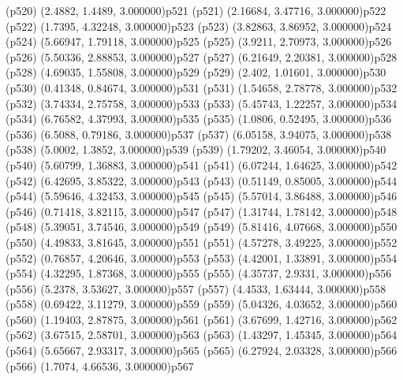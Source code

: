 \psdot(p520)
\psPoint(2.4882, 1.4489, 3.000000){p521}
\psdot(p521)
\psPoint(2.16684, 3.47716, 3.000000){p522}
\psdot(p522)
\psPoint(1.7395, 4.32248, 3.000000){p523}
\psdot(p523)
\psPoint(3.82863, 3.86952, 3.000000){p524}
\psdot(p524)
\psPoint(5.66947, 1.79118, 3.000000){p525}
\psdot(p525)
\psPoint(3.9211, 2.70973, 3.000000){p526}
\psdot(p526)
\psPoint(5.50336, 2.88853, 3.000000){p527}
\psdot(p527)
\psPoint(6.21649, 2.20381, 3.000000){p528}
\psdot(p528)
\psPoint(4.69035, 1.55808, 3.000000){p529}
\psdot(p529)
\psPoint(2.402, 1.01601, 3.000000){p530}
\psdot(p530)
\psPoint(0.41348, 0.84674, 3.000000){p531}
\psdot(p531)
\psPoint(1.54658, 2.78778, 3.000000){p532}
\psdot(p532)
\psPoint(3.74334, 2.75758, 3.000000){p533}
\psdot(p533)
\psPoint(5.45743, 1.22257, 3.000000){p534}
\psdot(p534)
\psPoint(6.76582, 4.37993, 3.000000){p535}
\psdot(p535)
\psPoint(1.0806, 0.52495, 3.000000){p536}
\psdot(p536)
\psPoint(6.5088, 0.79186, 3.000000){p537}
\psdot(p537)
\psPoint(6.05158, 3.94075, 3.000000){p538}
\psdot(p538)
\psPoint(5.0002, 1.3852, 3.000000){p539}
\psdot(p539)
\psPoint(1.79202, 3.46054, 3.000000){p540}
\psdot(p540)
\psPoint(5.60799, 1.36883, 3.000000){p541}
\psdot(p541)
\psPoint(6.07244, 1.64625, 3.000000){p542}
\psdot(p542)
\psPoint(6.42695, 3.85322, 3.000000){p543}
\psdot(p543)
\psPoint(0.51149, 0.85005, 3.000000){p544}
\psdot(p544)
\psPoint(5.59646, 4.32453, 3.000000){p545}
\psdot(p545)
\psPoint(5.57014, 3.86488, 3.000000){p546}
\psdot(p546)
\psPoint(0.71418, 3.82115, 3.000000){p547}
\psdot(p547)
\psPoint(1.31744, 1.78142, 3.000000){p548}
\psdot(p548)
\psPoint(5.39051, 3.74546, 3.000000){p549}
\psdot(p549)
\psPoint(5.81416, 4.07668, 3.000000){p550}
\psdot(p550)
\psPoint(4.49833, 3.81645, 3.000000){p551}
\psdot(p551)
\psPoint(4.57278, 3.49225, 3.000000){p552}
\psdot(p552)
\psPoint(0.76857, 4.20646, 3.000000){p553}
\psdot(p553)
\psPoint(4.42001, 1.33891, 3.000000){p554}
\psdot(p554)
\psPoint(4.32295, 1.87368, 3.000000){p555}
\psdot(p555)
\psPoint(4.35737, 2.9331, 3.000000){p556}
\psdot(p556)
\psPoint(5.2378, 3.53627, 3.000000){p557}
\psdot(p557)
\psPoint(4.4533, 1.63444, 3.000000){p558}
\psdot(p558)
\psPoint(0.69422, 3.11279, 3.000000){p559}
\psdot(p559)
\psPoint(5.04326, 4.03652, 3.000000){p560}
\psdot(p560)
\psPoint(1.19403, 2.87875, 3.000000){p561}
\psdot(p561)
\psPoint(3.67699, 1.42716, 3.000000){p562}
\psdot(p562)
\psPoint(3.67515, 2.58701, 3.000000){p563}
\psdot(p563)
\psPoint(1.43297, 1.45345, 3.000000){p564}
\psdot(p564)
\psPoint(5.65667, 2.93317, 3.000000){p565}
\psdot(p565)
\psPoint(6.27924, 2.03328, 3.000000){p566}
\psdot(p566)
\psPoint(1.7074, 4.66536, 3.000000){p567}
